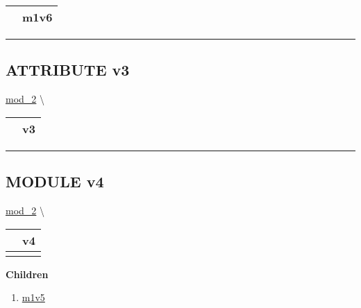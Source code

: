 {\renewcommand{\arraystretch}{1.5}
\begin{tabularx}{\textwidth}{|>{\raggedright\arraybackslash}l|X|}
\hline
\hspace{0pt}\mytexttt{\color{red} } & \textbf{m1v6} \\
\hline
\end{tabularx}
}

\par


\rule{\linewidth}{0.5pt}


\subsection*{\textsf{\colorbox{headtoc}{\color{white} ATTRIBUTE}
v3}}

\hypertarget{ecldoc:mod_2.v3}{}
\hspace{0pt} \hyperlink{ecldoc:mod_2}{mod_2} \textbackslash 

{\renewcommand{\arraystretch}{1.5}
\begin{tabularx}{\textwidth}{|>{\raggedright\arraybackslash}l|X|}
\hline
\hspace{0pt}\mytexttt{\color{red} } & \textbf{v3} \\
\hline
\end{tabularx}
}

\par


\rule{\linewidth}{0.5pt}
\subsection*{\textsf{\colorbox{headtoc}{\color{white} MODULE}
v4}}

\hypertarget{ecldoc:mod_2.v4}{}
\hspace{0pt} \hyperlink{ecldoc:mod_2}{mod_2} \textbackslash 

{\renewcommand{\arraystretch}{1.5}
\begin{tabularx}{\textwidth}{|>{\raggedright\arraybackslash}l|X|}
\hline
\hspace{0pt}\mytexttt{\color{red} } & \textbf{v4} \\
\hline
\multicolumn{2}{|>{\raggedright\arraybackslash}X|}{\hspace{0pt}\mytexttt{\color{param} (REAL8 a2)}} \\
\hline
\end{tabularx}
}

\par


\textbf{Children}
\begin{enumerate}
\item \hyperlink{ecldoc:mod_1.m1v4.m1v5}{m1v5}
\end{enumerate}

